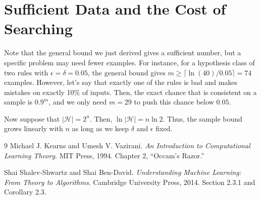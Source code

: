 \documentclass[11pt,fleqn]{article}
\newcommand{\Hy}{\mathcal H}
\newcommand{\eps}{\epsilon}
\begin{document}
\section{Sufficient Data and the Cost of Searching}

Note that the general bound we just derived gives a sufficient number, but a specific problem may need fewer examples. For instance, for a hypothesis class of two rules with $\epsilon = \delta = 0.05$, the general bound gives $m \geq \lceil \ln (40) / 0.05\rceil = 74$ examples. However, let's say that exactly one of the rules is bad and makes mistakes on exactly 10\% of inputs. Then, the exact chance that is consistent on a sample is $0.9^m$, and we only need $m = 29$ to push this chance below $0.05$.

Now suppose that $|\Hy| = 2^n$. Then, $\ln |\Hy| = n \ln 2$. Thus, the sample bound grows linearly with $n$ as long as we keep $\delta$ and $\eps$ fixed.
\begin{thebibliography}{9}
Michael J. Kearns and Umesh V. Vazirani.
\emph{An Introduction to Computational Learning Theory}.
MIT Press, 1994. Chapter 2, ``Occam's Razor.''

Shai Shalev-Shwartz and Shai Ben-David.
\emph{Understanding Machine Learning: From Theory to Algorithms}.
Cambridge University Press, 2014. Section 2.3.1 and Corollary 2.3.
\end{thebibliography}
\end{document}

